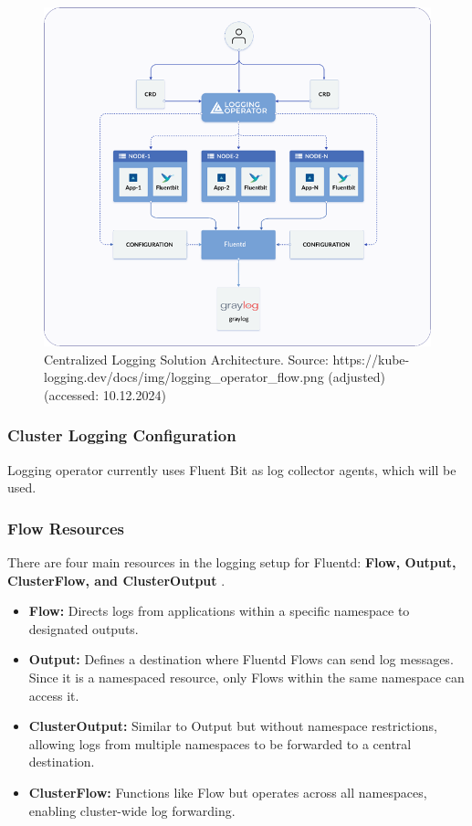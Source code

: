 \documentclass[../main.tex]{subfiles}
\begin{document}
\begin{figure}[H]
        \centering
        \includegraphics[]{img/3-background/centralized_logging/architecture.png}
        \caption{Centralized Logging Solution Architecture. Source: https://kube-logging.dev/docs/img/logging\_operator\_flow.png (adjusted) (accessed: 10.12.2024)}
        \label{fig:centralized_logging_architecture}
\end{figure}

\subsubsection{Cluster Logging Configuration}
Logging operator currently uses Fluent Bit as log collector agents, which will be used.

\subsubsection{Flow Resources}

There are four main resources in the logging setup for Fluentd: \textbf{Flow, Output, ClusterFlow, and ClusterOutput} \cite{logconfig}.  
\begin{itemize}
    \item \textbf{Flow:} Directs logs from applications within a specific namespace to designated outputs.
    \item \textbf{Output:} Defines a destination where Fluentd Flows can send log messages. Since it is a namespaced resource, only Flows within the same namespace can access it.
    \item \textbf{ClusterOutput:} Similar to Output but without namespace restrictions, allowing logs from multiple namespaces to be forwarded to a central destination.
    \item \textbf{ClusterFlow:} Functions like Flow but operates across all namespaces, enabling cluster-wide log forwarding.
\end{itemize}
\end{document}
